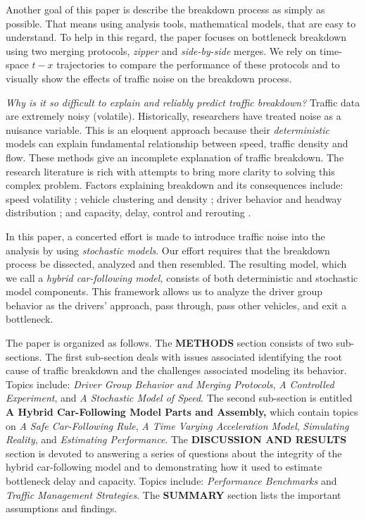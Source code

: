 \documentclass[Proceedings]{ascelike}
\begin{document}
Another goal of this paper is describe the breakdown process as simply as possible. That means using analysis tools, mathematical models, that are easy to understand. To help in this regard, the paper focuses on bottleneck breakdown using two merging protocols, \emph{zipper} and \emph{side-by-side} merges. We rely on time-space $t-x$ trajectories to compare the performance of these protocols and to visually show the effects of traffic noise on the breakdown process.

\emph{Why is it so difficult to explain and reliably predict traffic breakdown?} Traffic data are extremely noisy (volatile). Historically, researchers have treated noise as a nuisance variable. This is an eloquent  approach because their \emph{deterministic} models can explain fundamental relationship between speed, traffic density and flow. These methods give an incomplete explanation of traffic breakdown. The  research literature is rich with attempts to bring more clarity to solving this complex problem.  Factors explaining breakdown and its consequences include: speed volatility  \cite{WAGNER20121384}; vehicle clustering and density \cite{CASTILLO2001367}   \cite{GALTIER2012167} \cite{KISH2000271} \cite{MAHNKE20051} \cite{WEITS1992115}; driver behavior and headway distribution  \cite{OU2018105}; and capacity, delay, control and rerouting \cite{HU2018254} \cite{SMULDERS1990221} \cite{VODOPIVEC201722}. 

In this paper, a concerted effort is made to introduce traffic noise into the analysis by using \emph{stochastic models}. Our effort requires that the breakdown process be dissected, analyzed and then resembled. The resulting model, which we call a \emph{hybrid car-following model,} consists of both deterministic and stochastic model components. This framework allows us to analyze the driver group behavior as the drivers' approach, pass through, pass other vehicles, and exit a bottleneck.

The paper is organized as follows. The \textbf{METHODS} section consists of two sub-sections. The first sub-section deals with issues associated identifying the root cause  of traffic breakdown and the challenges associated modeling its behavior. Topics include:  \emph{Driver Group Behavior and Merging Protocols}, \emph{A Controlled Experiment}, and \emph{A Stochastic Model of Speed}. The second sub-section is entitled \textbf{A Hybrid Car-Following Model Parts and Assembly,} which contain topics on \emph{A Safe Car-Following Rule}, \emph{A Time Varying Acceleration Model}, \emph{Simulating Reality}, and \emph{Estimating Performance}. The \textbf{DISCUSSION AND RESULTS} section is devoted to answering a series of questions about  the integrity of the hybrid car-following model and to demonstrating how  it used to estimate bottleneck delay and capacity. Topics include: \emph{Performance Benchmarks} and \emph{Traffic Management Strategies}. The \textbf{SUMMARY} section lists the  important assumptions and findings.
\end{document}
